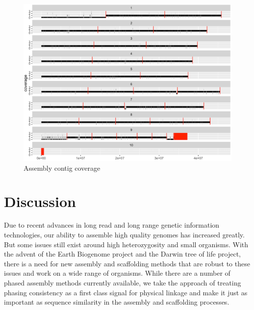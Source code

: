 {\begin{figure}[htbp!]
\caption{Assembly contig coverage}
\label{figure:contigcoverage}
\begin{centering}
\includegraphics[width=\textwidth]{assemblycontigcoverage.png}
\end{centering}
\end{figure}



\section{Discussion}

\par{
Due to recent advances in long read and long range genetic information technologies, our ability to assemble high quality genomes has increased greatly. But some issues still exist around high heterozygosity and small organisms. With the advent of the Earth Biogenome project and the Darwin tree of life project, there is a need for new assembly and scaffolding methods that are robust to these issues and work on a wide range of organisms. While there are a number of phased assembly methods currently available, we take the approach of treating phasing consistency as a first class signal for physical linkage and make it just as important as sequence similarity in the assembly and scaffolding processes.
} 

}
